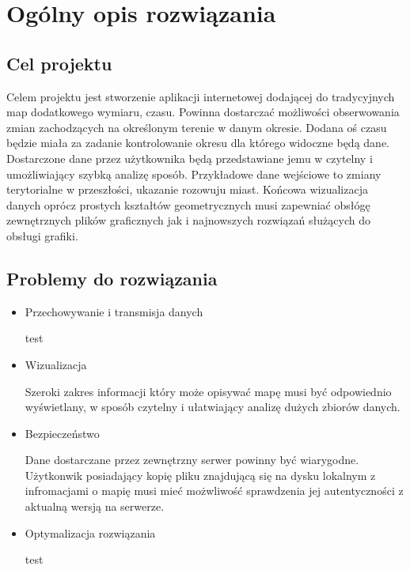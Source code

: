 \chapter{Ogólny opis rozwiązania}
\label{cha:opis}

\section{Cel projektu}
\label{sec:celProjektu}

Celem projektu jest stworzenie aplikacji internetowej dodającej do tradycyjnych map dodatkowego wymiaru, czasu. Powinna dostarczać możliwości obserwowania zmian zachodzących na określonym terenie w danym okresie. Dodana oś czasu będzie miała za zadanie kontrolowanie okresu dla którego widoczne będą dane. Dostarczone dane przez użytkownika będą przedstawiane jemu w czytelny i umożliwiający szybką analizę sposób. Przykładowe dane wejściowe to zmiany terytorialne w przeszłości, ukazanie rozowuju miast. Końcowa wizualizacja danych oprócz prostych kształtów geometrycznych musi zapewniać obsłógę zewnętrznych plików graficznych jak i najnowszych rozwiązań służących do obsługi grafiki.

\section{Problemy do rozwiązania}
\label{sec:problemy}

\begin{itemize}

\item
Przechowywanie i transmisja danych

test

\item
Wizualizacja

Szeroki zakres informacji który może opisywać mapę musi być odpowiednio wyświetlany, w sposób czytelny i ułatwiający analizę dużych zbiorów danych.

\item
Bezpieczeństwo

Dane dostarczane przez zewnętrzny serwer powinny być wiarygodne. Użytkonwik posiadający kopię pliku znajdującą się na dysku lokalnym z infromacjami o mapię musi mieć możwliwość sprawdzenia jej autentyczności z aktualną wersją na serwerze.

\item
Optymalizacja rozwiązania

test

\end{itemize}

